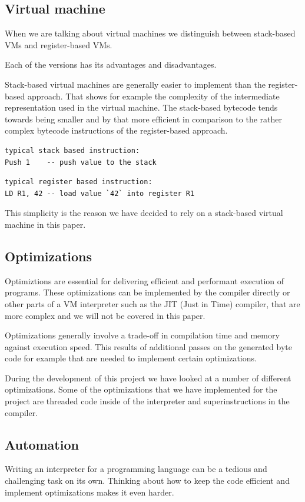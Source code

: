 \documentclass{article}
\begin{document}
\subsection{Virtual machine}
When we are talking about virtual machines we distinguish between stack-based VMs and 
register-based VMs.

Each of the versions has its advantages and disadvantages.

Stack-based virtual machines are generally easier to implement than the register-based approach.
That shows for example the complexity of the intermediate representation used in the virtual 
machine. The stack-based bytecode tends towards being smaller and by that more efficient in 
comparison to the rather complex bytecode instructions of the register-based approach.

\begin{verbatim}
typical stack based instruction:
Push 1    -- push value to the stack
\end{verbatim}

\begin{verbatim}
typical register based instruction:
LD R1, 42 -- load value `42` into register R1
\end{verbatim}

This simplicity is the reason we have decided to rely on a stack-based virtual machine in
this paper.

\subsection{Optimizations}
Optimiztions are essential for delivering efficient and performant execution of
programs. These optimizations can be implemented by the compiler directly or
other parts of a VM interpreter such as the JIT (Just in Time) compiler, that
are more complex and we will not be covered in this paper.

Optimizations generally involve a trade-off in compilation time and memory
against execution speed. This results of additional passes on the generated
byte code for example that are needed to implement certain optimizations.

During the development of this project we have looked at a number of different
optimizations. Some of the optimizations that we have implemented for the
project are threaded code inside of the interpreter and superinstructions in
the compiler.

\subsection{Automation}
Writing an interpreter for a programming language can be a tedious and
challenging task on its own. Thinking about how to keep the code efficient and
implement optimizations makes it even harder.
\end{document}

